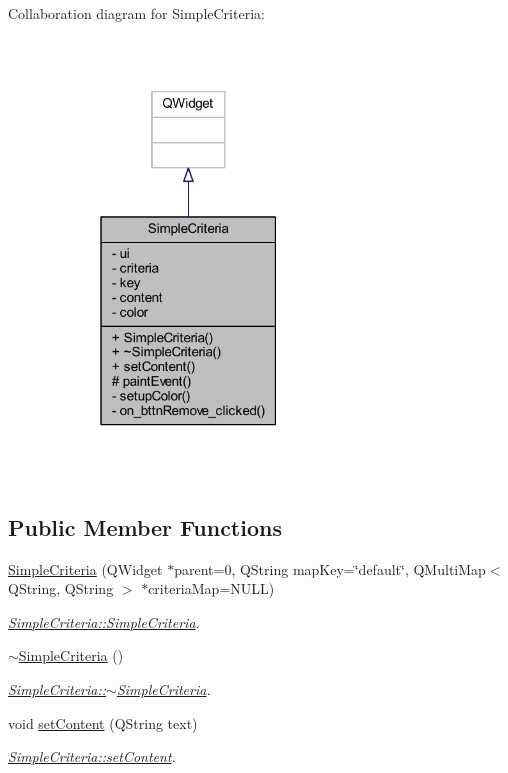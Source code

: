 Collaboration diagram for Simple\+Criteria\+:
\nopagebreak
\begin{figure}[H]
\begin{center}
\leavevmode
\includegraphics[width=211pt]{class_simple_criteria__coll__graph}
\end{center}
\end{figure}
\subsection*{Public Member Functions}
\begin{DoxyCompactItemize}
\item 
\hyperlink{class_simple_criteria_a78a6330050abac3b1b570512a6c2b448}{Simple\+Criteria} (Q\+Widget $\ast$parent=0, Q\+String map\+Key=\char`\"{}default\char`\"{}, Q\+Multi\+Map$<$ Q\+String, Q\+String $>$ $\ast$criteria\+Map=N\+U\+L\+L)
\begin{DoxyCompactList}\small\item\em \hyperlink{class_simple_criteria_a78a6330050abac3b1b570512a6c2b448}{Simple\+Criteria\+::\+Simple\+Criteria}. \end{DoxyCompactList}\item 
\hyperlink{class_simple_criteria_a2ac634aeb094ce35a8136b81a2c99f8b}{$\sim$\+Simple\+Criteria} ()
\begin{DoxyCompactList}\small\item\em \hyperlink{class_simple_criteria_a2ac634aeb094ce35a8136b81a2c99f8b}{Simple\+Criteria\+::$\sim$\+Simple\+Criteria}. \end{DoxyCompactList}\item 
void \hyperlink{class_simple_criteria_abad0685c0d1a9be0dd6fbf2e54fe0238}{set\+Content} (Q\+String text)
\begin{DoxyCompactList}\small\item\em \hyperlink{class_simple_criteria_abad0685c0d1a9be0dd6fbf2e54fe0238}{Simple\+Criteria\+::set\+Content}. \end{DoxyCompactList}\end{DoxyCompactItemize}

